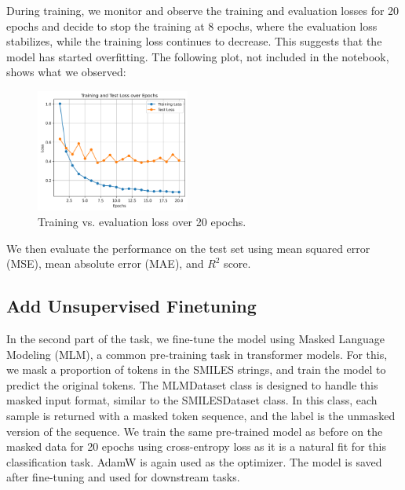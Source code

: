 \documentclass[11pt]{article}
\begin{document}
During training, we monitor and observe the training and evaluation losses for 20 epochs and decide to stop the training at 8 epochs, where the evaluation loss stabilizes, while the training loss continues to decrease. This suggests that the model has started overfitting. The following plot, not included in the notebook, shows what we observed: 
\begin{figure}[ht]
  \centering
  \includegraphics[width=0.45\textwidth]{images/1.training_loss_plot.png}
  \caption{Training vs. evaluation loss over 20 epochs.}
  \label{fig:results}
\end{figure}

We then evaluate the performance on the test set using mean squared error (MSE), mean absolute error (MAE), and $R^2$ score.
\subsection{Add Unsupervised Finetuning}
In the second part of the task, we fine-tune the model using Masked Language Modeling (MLM), a common pre-training task in transformer models. For this, we mask a proportion of tokens in the SMILES strings, and train the model to predict the original tokens.
The MLMDataset class is designed to handle this masked input format, similar to the SMILESDataset class. In this class, each sample is returned with a masked token sequence, and the label is the unmasked version of the sequence.
We train the same pre-trained model as before on the masked data for 20 epochs using cross-entropy loss as it is a natural fit for this classification task. AdamW is again used as the optimizer. The model is saved after fine-tuning and used for downstream tasks.
\end{document}
